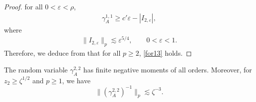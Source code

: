 \documentclass[12pt,a4paper]{article}
\newcommand{\E}{\mathrm{E}}
\newcommand {\deltah}{{\zeta}}
\newcommand{\<}{\langle}
\renewcommand{\>}{\rangle}
\begin{document}
\begin{proof}
         for all $0<\varepsilon<\rho$,
         \begin{align*}
         \gamma_A^{1,1}\geq c'\varepsilon - |I_{2, \varepsilon}|,
         \end{align*}
         where 
         \begin{align*}
         \|I_{2, \varepsilon}\|_p \lesssim \varepsilon^{5/4}, \qquad 0 < \varepsilon < 1.
         \end{align*}
Therefore, we deduce from \cite[Proposition 3.5]{DKN09} that for all $p\geq 2$, \eqref{for13} holds.
 \end{proof}
 
 
\begin{lemma} \label{lem:gamma22}
The random variable $\gamma_A^{2,2}$ has finite negative moments of all orders. Moreover, for $z_2 \ge \deltah^{1/2}$ and $p\ge 1$, we have
 \begin{equation}   \label{equ2}
 \| (\gamma_A^{2,2})^{-1}\|_{p} \lesssim \deltah^{-3}.
 \end{equation}
 \end{lemma}
 
\end{document}
